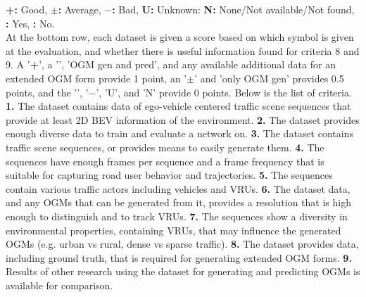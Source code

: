 \begin{table}[h!]
{		\textbf{+:} Good, \textbf{$\pm$:} Average, \textbf{$-$:} Bad, \textbf{U:} Unknown: \textbf{N:} None/Not available/Not found, \textbf{\cmark:} Yes, \textbf{\xmark:} No. \\\hspace{\textwidth} 
		At the bottom row, each dataset is given a score based on which symbol is given at the evaluation, and whether there is useful information found for criteria 8 and 9. A '\textbf{+}', a '\textbf{\cmark}', 'OGM gen and pred', and any available additional data for an extended OGM form provide 1 point, an '\textbf{$\pm$}' and 'only OGM gen' provides 0.5 points, and the '\textbf{\xmark}', '\textbf{$-$}', 'U', and 'N' provide 0 points.  
		Below is the list of criteria. \\\hspace{\textwidth} 	
		\textbf{1.} The dataset contains data of ego-vehicle centered traffic scene sequences that provide at least 2D \gls{BEV} information of the environment.
		\textbf{2.} The dataset provides enough diverse data to train and evaluate a network on.
		\textbf{3.} The dataset contains traffic scene sequences, or provides means to easily generate them.
		\textbf{4.} The sequences have enough frames per sequence and a frame frequency that is suitable for capturing road user behavior and trajectories.
		\textbf{5.} The sequences contain various traffic actors including vehicles and \glspl{VRU}.
		\textbf{6.} The dataset data, and any \glspl{OGM} that can be generated from it, provides a resolution that is high enough to distinguish and to track \glspl{VRU}. 
		\textbf{7.} The sequences show a diversity in environmental properties, containing \glspl{VRU}, that may influence the generated \glspl{OGM} (e.g. urban vs rural, dense vs sparse traffic).
		\textbf{8.} The dataset provides data, including ground truth, that is required for generating extended \gls{OGM} forms.
		\textbf{9.} Results of other research using the dataset for generating and predicting \glspl{OGM} is available for comparison.}
	\label{tab:datasets_criteria}
\end{table}


